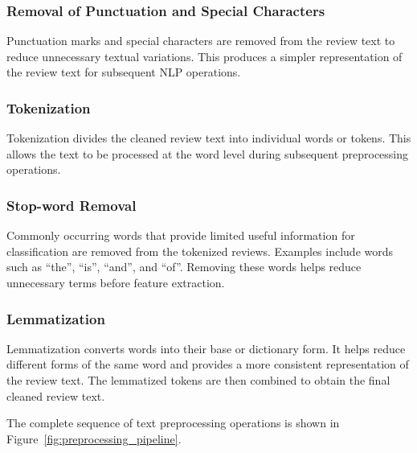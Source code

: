 \documentclass[12pt,a4paper]{report}
\begin{document}
\subsubsection*{Removal of Punctuation and Special Characters}

Punctuation marks and special characters are removed from the review text to reduce unnecessary textual variations. This produces a simpler representation of the review text for subsequent NLP operations.

\subsubsection*{Tokenization}

Tokenization divides the cleaned review text into individual words or tokens. This allows the text to be processed at the word level during subsequent preprocessing operations.

\subsubsection*{Stop-word Removal}

Commonly occurring words that provide limited useful information for classification are removed from the tokenized reviews. Examples include words such as ``the'', ``is'', ``and'', and ``of''. Removing these words helps reduce unnecessary terms before feature extraction.

\subsubsection*{Lemmatization}

Lemmatization converts words into their base or dictionary form. It helps reduce different forms of the same word and provides a more consistent representation of the review text. The lemmatized tokens are then combined to obtain the final cleaned review text.

The complete sequence of text preprocessing operations is shown in Figure~\ref{fig:preprocessing_pipeline}.
\end{document}
